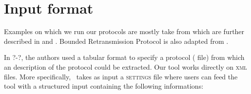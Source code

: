 \section{Input format}\label{sec:input}

Examples on which we run our protocols are mostly take from \cite{JRSVgit} 
which are further described in \cite{MPSV11} and \cite{RSV11}.
Bounded Retransmission Protocol is also adapted from \cite{AABJ04}.

In ?-?, the authors used a tabular format to specify a protocol ( file)
from which an  description of the protocol could be extracted.
Our tool works directly on \textsc{xml} files.
More specifically, \MPass\ takes as input a \textsc{settings} file where users can feed the tool with a structured input containing the following informations:

